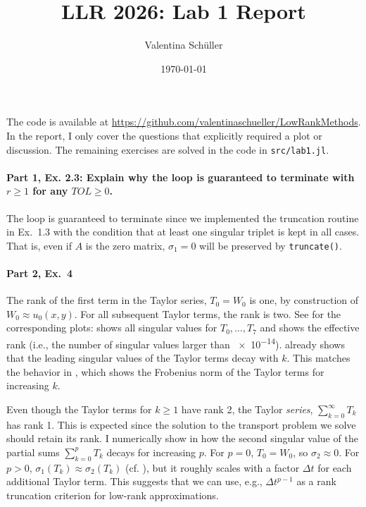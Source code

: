 \documentclass{article}
\title{LLR 2026: Lab 1 Report}
\author{Valentina Schüller}
\date{\today}
\begin{document}
\maketitle

The code is available at
\url{https://github.com/valentinaschueller/LowRankMethods}.
In the report, I only cover the questions that explicitly required a
plot or discussion.
The remaining exercises are solved in the code in \verb|src/lab1.jl|.

\paragraph{Part 1, Ex. 2.3: Explain why the loop is guaranteed to
  terminate with \(r \geq 1\) for
any \(TOL \geq 0\).}
The loop is guaranteed to terminate since we implemented the
truncation routine in Ex.~1.3 with the condition that at least one
singular triplet is kept in all cases.
That is, even if \(A\) is the zero matrix, \(\sigma_1=0\) will be
preserved by \verb|truncate()|.

\paragraph{Part 2, Ex.~4}
The rank of the first term in the Taylor series, \(T_0=W_0\) is one, by
construction of \(W_0\approx u_0(x,y)\).
For all subsequent Taylor terms, the rank is two.
See  for the corresponding plots:
 shows all singular values for \(T_0,\dots,T_7\)
and  shows the effective rank (i.e., the number
of singular values larger than \num{e-14}).
 already shows that the leading singular values
of the Taylor terms decay with \(k\).
This matches the behavior in , which shows
the Frobenius norm of the Taylor terms for increasing \(k\).

Even though the Taylor terms for \(k\geq1\) have rank 2, the Taylor
\emph{series}, \(\sum_{k=0}^\infty T_k\) has rank 1.
This is expected since the solution to the transport problem we solve
should retain its rank.
I numerically show in  how the second
singular value of the partial sums \(\sum_{k=0}^{p}T_k\) decays for
increasing \(p\).
For \(p=0\), \(T_0=W_0\), so \(\sigma_2\approx 0\).
For \(p>0\), \(\sigma_1(T_k)\approx \sigma_2(T_k)\) (cf.
), but it roughly scales with a factor \(\Delta t\)
for each additional Taylor term.
This suggests that we can use, e.g., \(\Delta t^{p-1}\) as a rank
truncation criterion for low-rank approximations.
\end{document}
